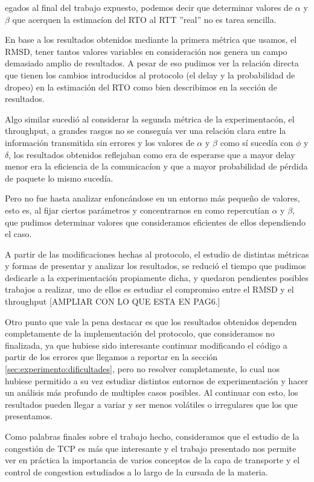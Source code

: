 egados al final del trabajo expuesto, podemos decir que determinar valores 
de $\alpha$ y $\beta$ que acerquen la estimac\'ion del RTO al RTT ''real'' no es tarea sencilla.

En base a los resultados obtenidos mediante la primera m\'etrica que usamos, el RMSD, tener 
tantos valores variables en consideraci\'on nos genera un campo demasiado amplio de resultados.
A pesar de eso pudimos ver la relaci\'on directa que tienen los cambios introducidos al
protocolo (el delay y la probabilidad de dropeo) en la estimaci\'on del RTO como bien describimos
en la secci\'on de resultados.

Algo similar sucedi\'o al considerar la segunda m\'etrica de la experimentac\'on, el throughput,
a grandes rasgos no se consegu\'ia ver una relaci\'on clara entre la informaci\'on transmitida sin
errores y los valores de $\alpha$ y $\beta$ como s\'i suced\'ia con $\phi$ y $\delta$, los resultados 
obtenidos reflejaban como era de esperarse que a mayor delay menor era la eficiencia de la comunicac\'ion 
y que a mayor probabilidad de p\'erdida de paquete lo mismo suced\'ia.


Pero no fue hasta analizar enfonc\'andose en un entorno m\'as peque\~no de valores, esto es,
al fijar ciertos par\'ametros y concentrarnos en como repercut\'ian $\alpha$ y $\beta$, que pudimos 
determinar valores que consideramos eficientes de ellos dependiendo el caso.

A partir de las modificaciones hechas al protocolo, el estudio de distintas m\'etricas y formas de
presentar y analizar los resultados, se reduci\'o el tiempo que pudimos dedicarle a la experimentaci\'on
propiamente dicha, y quedaron pendientes posibles trabajos a realizar, uno de ellos es estudiar el
compromiso entre el RMSD y el throughput [AMPLIAR CON LO QUE ESTA EN PAG6.]

Otro punto que vale la pena destacar es que los resultados obtenidos dependen completamente de la 
implementaci\'on del protocolo, que consideramos no finalizada, ya que hubiese sido interesante
continuar modificando el c\'odigo a partir de los errores que llegamos a reportar en la secci\'on 
\ref{sec:experimento:dificultades}, pero no resolver completamente, lo cual nos hubiese permitido 
a su vez estudiar distintos entornos de experimentaci\'on y hacer un an\'alisis m\'as profundo de 
multiples casos posibles. Al continuar con esto, los resultados pueden llegar a variar y ser
menos vol\'atiles o irregulares que los que presentamos.

Como palabras finales sobre el trabajo hecho, consideramos que el estudio de la congesti\'on de TCP
es m\'as que interesante y el trabajo presentado nos permite ver en pr\'actica la importancia de varios 
conceptos de la capa de transporte y el control de congestion estudiados a lo largo de la cursada
de la materia.
